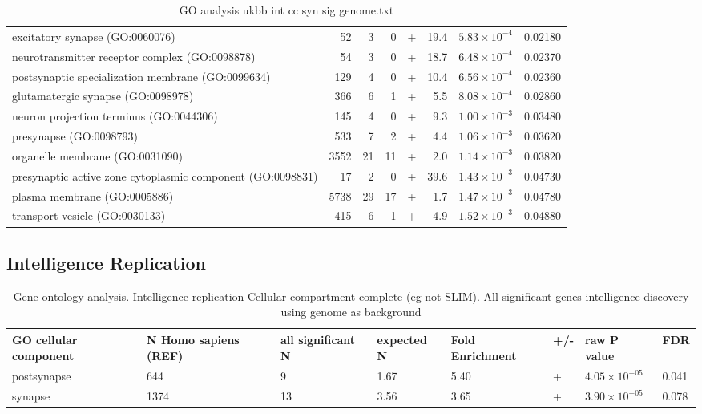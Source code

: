 \begin{table}[ht]
\begin{adjustbox}{width=\textwidth}
\begin{tabular}{lrrrlrrr}
  excitatory synapse (GO:0060076) & 52 & 3 & 0 & + & 19.4 & $5.83 \times 10^{-4}$ & 0.02180 \\ 
  neurotransmitter receptor complex (GO:0098878) & 54 & 3 & 0 & + & 18.7 & $6.48 \times 10^{-4}$ & 0.02370 \\ 
  postsynaptic specialization membrane (GO:0099634) & 129 & 4 & 0 & + & 10.4 & $6.56 \times 10^{-4}$ & 0.02360 \\ 
  glutamatergic synapse (GO:0098978) & 366 & 6 & 1 & + & 5.5 & $8.08 \times 10^{-4}$ & 0.02860 \\ 
  neuron projection terminus (GO:0044306) & 145 & 4 & 0 & + & 9.3 & $1.00 \times 10^{-3}$ & 0.03480 \\ 
  presynapse (GO:0098793) & 533 & 7 & 2 & + & 4.4 & $1.06 \times 10^{-3}$ & 0.03620 \\ 
  organelle membrane (GO:0031090) & 3552 & 21 & 11 & + & 2.0 & $1.14 \times 10^{-3}$ & 0.03820 \\ 
  presynaptic active zone cytoplasmic component (GO:0098831) & 17 & 2 & 0 & + & 39.6 & $1.43 \times 10^{-3}$ & 0.04730 \\ 
  plasma membrane (GO:0005886) & 5738 & 29 & 17 & + & 1.7 & $1.47 \times 10^{-3}$ & 0.04780 \\ 
  transport vesicle (GO:0030133) & 415 & 6 & 1 & + & 4.9 & $1.52 \times 10^{-3}$ & 0.04880 \\ 
   \hline
\end{tabular}
\end{adjustbox}
\caption{GO analysis ukbb int cc syn sig genome.txt} 
\label{tab:GO analysis ukbb_int_cc_syn_sig_genome.txt}
\end{table}
\subsection{Intelligence Replication}
\begin{table}[h]
    \centering
    \begin{adjustbox}{width=\textwidth}
 
    \begin{tabular}{llllllll}
    \toprule
    
    GO cellular component  & N Homo sapiens (REF)	& all significant  N &	expected N &	Fold Enrichment& 	+/- &	raw P value &	FDR \\
    \midrule
     postsynapse &	644& 	9 &	1.67& 	5.40& 	+ &	$4.05 \times 10^{-05}$ &	0.041      \\
     synapse &	1374 &	13 &	3.56 	&3.65 	&+ &	$3.90\times 10^{-05}$ &	0.078    \\ 
     \bottomrule
    \end{tabular}
    \end{adjustbox}
    \caption{Gene ontology analysis. Intelligence replication Cellular compartment complete (eg not SLIM). All significant genes intelligence discovery using genome as background}
    \label{tab:GO analysis CC Significant discovery genes}
\end{table}

